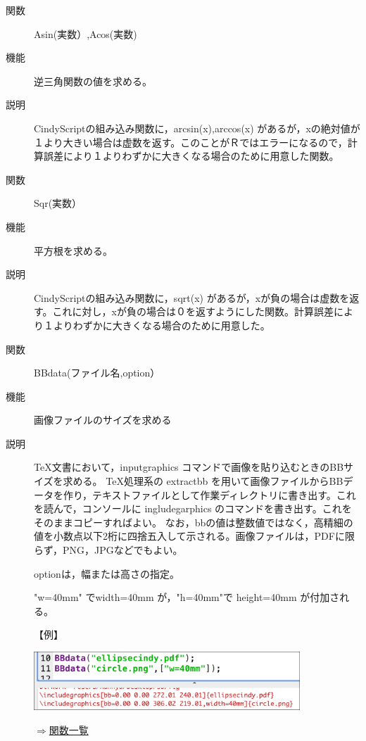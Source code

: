 \documentclass[papersize,a4paper,10pt,uplatex]{jsarticle}
\begin{document}
\begin{description}

\hypertarget{asin}{}
\item[関数]Asin(実数）,Acos(実数)
\item[機能]逆三角関数の値を求める。
\item[説明]CindyScriptの組み込み関数に，arcsin(x),arccos(x) があるが，xの絶対値が１より大きい場合は虚数を返す。このことがＲではエラーになるので，計算誤差により１よりわずかに大きくなる場合のために用意した関数。

\vspace{\baselineskip}
\hypertarget{sqr}{}
\item[関数]Sqr(実数）
\item[機能]平方根を求める。
\item[説明]CindyScriptの組み込み関数に，sqrt(x) があるが，xが負の場合は虚数を返す。これに対し，xが負の場合は０を返すようにした関数。計算誤差により１よりわずかに大きくなる場合のために用意した。

\vspace{\baselineskip}
\hypertarget{bbdata}{}
\item[関数]BBdata(ファイル名,option）
\item[機能]画像ファイルのサイズを求める
\item[説明]TeX文書において，inputgraphics コマンドで画像を貼り込むときのBBサイズを求める。
TeX処理系の extractbb を用いて画像ファイルからBBデータを作り，テキストファイルとして作業ディレクトリに書き出す。これを読んで，コンソールに ingludegarphics のコマンドを書き出す。これをそのままコピーすればよい。 なお，bbの値は整数値ではなく，高精細の値を小数点以下2桁に四捨五入して示される。画像ファイルは，PDFに限らず，PNG，JPGなどでもよい。

optionは，幅または高さの指定。

"w=40mm" でwidth=40mm が，"h=40mm"で height=40mm が付加される。

\vspace{\baselineskip}
【例】

\vspace{\baselineskip}
\includegraphics[bb=0.00 0.00 562.03 124.01,width=10cm]{Fig/bbdata.pdf} 

\begin{flushright}\hyperlink{functionlist}{$\Rightarrow$関数一覧}\end{flushright}


\end{description}
\end{document}
